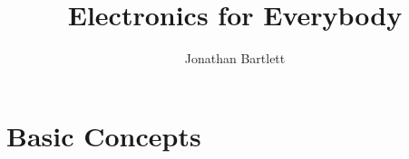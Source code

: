 \documentclass{book}
\begin{document}
\sloppy

\frontmatter

\title{Electronics for Everybody}
\author{Jonathan Bartlett}



\tableofcontents

\mainmatter




\part{Basic Concepts}












\appendix






\end{document}
